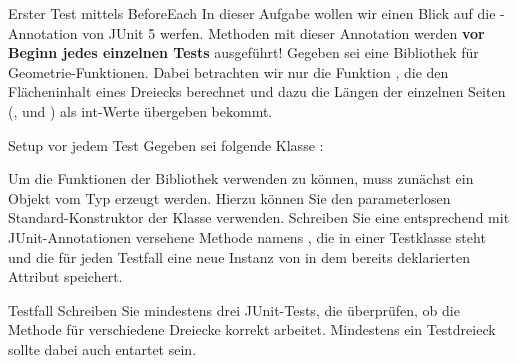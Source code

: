 \documentclass{../preamble}
\begin{document}
\begin{task}[credit = \stars{2}{3}]{Erster Test mittels BeforeEach}
    In dieser Aufgabe wollen wir einen Blick auf die -Annotation von JUnit 5 werfen. Methoden mit dieser Annotation werden \textbf{vor Beginn jedes einzelnen Tests} ausgeführt!
    \br
    Gegeben sei eine Bibliothek für Geometrie-Funktionen. Dabei betrachten wir nur die Funktion , die den Flächeninhalt eines Dreiecks berechnet und dazu die Längen der einzelnen Seiten  (,  und ) als \textcolor{keywordcolor}{int}-Werte übergeben bekommt.

    \begin{subtask*}{Setup vor jedem Test}
        Gegeben sei folgende Klasse :
        
        Um die Funktionen der Bibliothek verwenden zu können, muss zunächst ein Objekt vom Typ  erzeugt werden. Hierzu können Sie den parameterlosen Standard-Konstruktor der Klasse  verwenden. Schreiben Sie eine entsprechend mit JUnit-Annotationen versehene Methode namens , die in einer Testklasse steht und die für jeden Testfall eine neue Instanz von  in dem bereits deklarierten Attribut  speichert.

        \begin{solution}
            
        \end{solution}
    \end{subtask*}

    \clearpage

    \begin{subtask*}{Testfall}
        Schreiben Sie mindestens drei JUnit-Tests, die überprüfen, ob die Methode  für verschiedene Dreiecke korrekt arbeitet. Mindestens ein Testdreieck sollte dabei auch entartet sein.

        \begin{solution}
            
        \end{solution}
    \end{subtask*}
\end{task}

\clearpage
\end{document}
